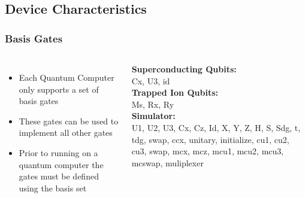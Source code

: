 \documentclass[aspectratio=169,11pt,hyperref={colorlinks=true}]{beamer}
\begin{document}
\subsection{Device Characteristics}
\begin{frame}
    \frametitle{Basis Gates}
    \begin{columns}
        \begin{itemize}
            \item Each Quantum Computer only supports a set of basis gates
            \item These gates can be used to implement all other gates
            \item Prior to running on a quantum computer the gates must be
                defined using the basis set
        \end{itemize}
            \textbf{Superconducting Qubits:}\\
                Cx, U3, id\\
            \textbf{Trapped Ion Qubits:}\\
                Ms, Rx, Ry\\
            \textbf{Simulator:}\\
                U1, U2, U3, Cx, Cz, Id, X, Y, Z, H, S, Sdg, t, tdg, swap, ccx, unitary, initialize, cu1, cu2, cu3, swap, mcx, mcz, mcu1, mcu2, mcu3, mcswap, muliplexer\\
    \end{columns}
\end{frame}
\end{document}
